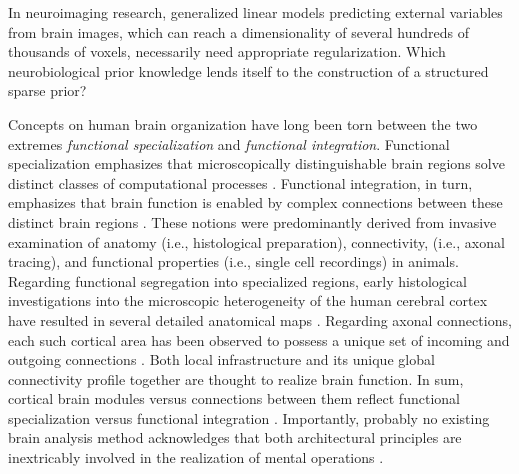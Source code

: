 \documentclass{article} %
\begin{document}
In neuroimaging research, generalized linear models predicting external 
variables from brain images, which can reach a dimensionality of several
hundreds of thousands of voxels, necessarily need appropriate regularization.
Which neurobiological prior knowledge lends itself to the construction of a
structured sparse prior?


Concepts on human brain organization have long been torn
between the two extremes
\textit{functional specialization} and \textit{functional integration}.
Functional specialization emphasizes that microscopically distinguishable
brain regions solve distinct classes of computational processes
\cite{kanwisher2010functional}.
Functional integration, in turn, emphasizes that brain function
is enabled by complex connections between these
distinct brain regions \cite{sporns14nn}.
%
These notions were predominantly derived from
invasive examination of anatomy (i.e., histological preparation),
connectivity, (i.e., axonal tracing),
and functional properties
(i.e., single cell recordings) in animals.
Regarding functional segregation into specialized regions,
early histological investigations into the microscopic heterogeneity of
the human cerebral cortex have resulted
in several detailed anatomical maps
\cite{brodmann1909vergleichende, vogt1919allgemeine}.
Regarding axonal connections,
each such cortical area has been observed
to possess a unique set of incoming and outgoing connections
\cite{passingham2002, young93monkey, scannell95cat}.
%
Both
local
infrastructure
and its unique global connectivity profile
together are thought to realize brain function.
%
In sum,
cortical brain modules versus connections between them
reflect 
functional specialization versus functional integration
\cite{friston2002beyond, mesulam_sensation}.
Importantly,
probably no existing brain analysis method acknowledges that
both architectural principles are inextricably involved
in the realization of mental operations
\cite{tononi1998complexity, saygin2012}.
\end{document}
